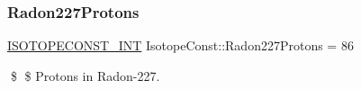 \subsubsection{\texorpdfstring{Radon227\+Protons}{Radon227Protons}}
{\footnotesize\ttfamily \mbox{\hyperlink{group___isotope_const-_macros_ga5f18360b3e99483a35c32d789e62621c}{I\+S\+O\+T\+O\+P\+E\+C\+O\+N\+S\+T\+\_\+\+I\+NT}} Isotope\+Const\+::\+Radon227\+Protons = 86}

\$ \$ Protons in Radon-\/227. 